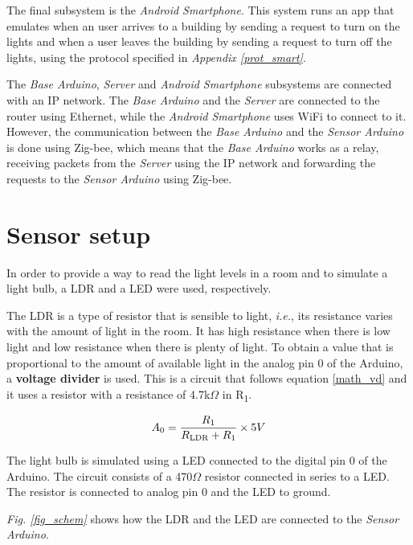 \documentclass[conference, a4paper]{IEEEtran}
\begin{document}
The final subsystem is the \textit{Android Smartphone}. This system runs an app that emulates when an user arrives to a building by sending a request to turn on the lights and when a user leaves the building by sending a request to turn off the lights, using the protocol specified in \textit{Appendix \ref{prot_smart}}.

The \textit{Base Arduino}, \textit{Server} and \textit{Android Smartphone} subsystems are connected with an IP network. The \textit{Base Arduino} and the \textit{Server} are connected to the router using Ethernet, while the \textit{Android Smartphone} uses WiFi to connect to it. However, the communication between the \textit{Base Arduino} and the \textit{Sensor Arduino} is done using Zig-bee, which means that the \textit{Base Arduino} works as a relay, receiving packets from the \textit{Server} using the IP network and forwarding the requests to the \textit{Sensor Arduino} using Zig-bee.

\section{Sensor setup}

In order to provide a way to read the light levels in a room and to simulate a light bulb, a LDR and a LED were used, respectively.

The LDR is a type of resistor that is sensible to light, \textit{i.e.}, its resistance varies with the amount of light in the room. It has high resistance when there is low light and low resistance when there is plenty of light. To obtain a value that is proportional to the amount of available light in the analog pin 0 of the Arduino, a \textbf{voltage divider} is used. This is a circuit that follows equation \ref{math_vd} and it uses a resistor with a resistance of 4.7k$\Omega$ in R\textsubscript{1}.

\begin{equation}
A\textsubscript{0} = \frac{R\textsubscript{1}}{R\textsubscript{LDR}+R\textsubscript{1}}\times5V
\label{math_vd}
\end{equation}

The light bulb is simulated using a LED connected to the digital pin 0 of the Arduino. The circuit consists of a 470$\Omega$ resistor connected in series to a LED. The resistor is connected to analog pin 0 and the LED to ground.

\textit{Fig. \ref{fig_schem}} shows how the LDR and the LED are connected to the \textit{Sensor Arduino}.
\end{document}
